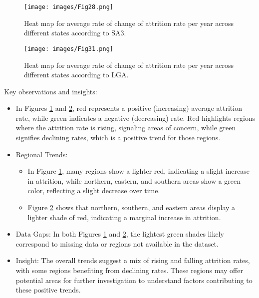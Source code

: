 \documentclass[conference]{IEEEtran}
\begin{document}
\begin{figure}[H]
    \centering
    \texttt{[image: images/Fig28.png]}
    \caption{Heat map for average rate of change of attrition rate per year across different states according to SA3.}
    \label{fig:heatmap1}
\end{figure}
\begin{figure}[H]
    \centering
    \texttt{[image: images/Fig31.png]}
    \caption{Heat map for average rate of change of attrition rate per year across different states according to LGA.}
    \label{fig:heatmap2}
\end{figure}
\clearpage
{Key observations and insights:}
\vspace{10pt}
\begin{itemize} 
    \item In Figures \ref{fig:heatmap1} and \ref{fig:heatmap2}, red represents a positive (increasing) average attrition rate, while green indicates a negative (decreasing) rate. Red highlights regions where the attrition rate is rising, signaling areas of concern, while green signifies declining rates, which is a positive trend for those regions.
    
    \item {Regional Trends:}
    \begin{itemize}
        \item In Figure \ref{fig:heatmap1}, many regions show a lighter red, indicating a slight increase in attrition, while northern, eastern, and southern areas show a green color, reflecting a slight decrease over time.
        \item Figure \ref{fig:heatmap2} shows that northern, southern, and eastern areas display a lighter shade of red, indicating a marginal increase in attrition.
    \end{itemize}
    
    \item Data Gaps: In both Figures \ref{fig:heatmap1} and \ref{fig:heatmap2}, the lightest green shades likely correspond to missing data or regions not available in the dataset.
    
    \item Insight: The overall trends suggest a mix of rising and falling attrition rates, with some regions benefiting from declining rates. These regions may offer potential areas for further investigation to understand factors contributing to these positive trends.
\end{itemize}
\end{document}
